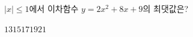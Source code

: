 $|x|\le 1$에서 이차함수 $y=2x^2+8x+9$의 최댓값은?
\begin{choices32}{$13$}{$15$}{$17$}{$19$}{$21$}\end{choices32}
